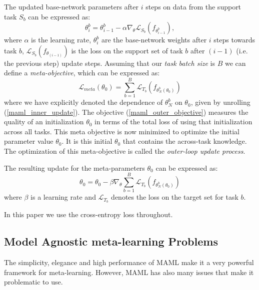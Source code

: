\documentclass{article} \usepackage[dvipsnames]{xcolor}
\newcommand{\cut}[1]{}
\begin{document}
The updated base-network parameters after $i$ steps on data from the support task $S_{b}$ can be expressed as:
\begin{equation}\label{maml_inner_update}
\theta^{b}_{i} = \theta^{b}_{{i-1}} - \alpha \nabla_{\theta} \mathcal{L}_{S_b}(f_{\theta^{b}_{{i-1}}}),
\end{equation}
where $\alpha$ is the learning rate, $\theta^{b}_{i}$ are the base-network weights after $i$ steps towards task $b$, $\mathcal{L}_{S_{b}}(f_{\theta_{(i-1)}})$ is the loss on the support set of task $b$ after $(i-1)$ (i.e. the previous step) update steps.
Assuming \cut{our model takes $N$ steps towards the support set loss before computing the target set loss, and }that our \emph{task batch size} is $B$ we can define a \emph{meta-objective}, which can be expressed as:
\begin{equation}\label{maml_outer_objective}
\mathcal{L}_{meta}(\theta_0) = \sum_{b=1}^{B} \mathcal{L}_{T_{b}}(f_{\theta^{b}_{N}(\theta_0)})
\end{equation}
where we have explicitly denoted the dependence of $\theta^{b}_{N}$ on $\theta_0$, given by unrolling (\ref{maml_inner_update}). The objective (\ref{maml_outer_objective}) measures the quality of an initialization $\theta_0$ in terms of the total loss of using that initialization across all tasks. This meta objective is now minimized to optimize the initial parameter value $\theta_0$. It is this initial $\theta_0$ that contains the across-task knowledge. The optimization of this meta-objective is called the \emph{outer-loop update process}.

The resulting update for the meta-parameters $\theta_0$ can be expressed as:
\begin{equation}\label{maml_outer_update}
\theta_0 = \theta_0 - \beta \nabla_{\theta} \sum_{b=1}^{B} \mathcal{L}_{T_{b}}(f_{\theta^{b}_{N}(\theta_0)})
\end{equation}
where $\beta$ is a learning rate and $\mathcal{L}_{T_{b}}$ denotes the loss on the target set for task $b$.

In this paper we use the cross-entropy \citep{de2005tutorial,rubinstein1999cross} loss throughout.

\subsection{Model Agnostic meta-learning Problems}\label{section:maml-issues}
The simplicity, elegance and high performance of MAML make it a very powerful framework for meta-learning. However, MAML has also many issues that make it problematic to use. 
\end{document}
